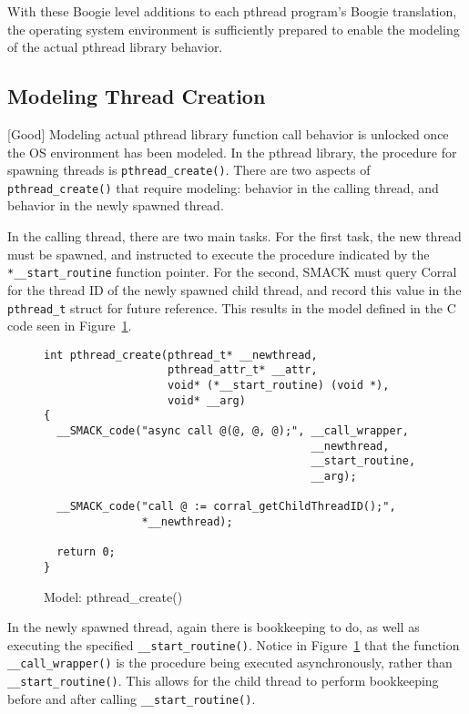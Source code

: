 With these Boogie level additions to each pthread program's Boogie
translation, the operating system environment is sufficiently prepared
to enable the modeling of the actual pthread library behavior.

\subsection{Modeling Thread Creation}
[Good]
Modeling actual pthread library function call behavior is unlocked
once the OS environment has been modeled.  In the pthread library, the
procedure for spawning threads is \lstinline|pthread_create()|.  There
are two aspects of \lstinline|pthread_create()| that require modeling:
behavior in the calling thread, and behavior in the newly spawned
thread.

In the calling thread, there are two main tasks.  For the first task,
the new thread must be spawned, and instructed to execute the
procedure indicated by the \lstinline|*__start_routine| function
pointer.  For the second, SMACK must query Corral for the thread ID of
the newly spawned child thread, and record this value in the
\lstinline|pthread_t| struct for future reference.  This results in
the model defined in the C code seen in Figure~\ref{fig:pthread_create}.

\begin{figure}[h]
\centering
\caption{Model: pthread\_create()}\label{fig:pthread_create}
\begin{lstlisting}
int pthread_create(pthread_t* __newthread,
                   pthread_attr_t* __attr,
                   void* (*__start_routine) (void *),
                   void* __arg)
{
  __SMACK_code("async call @(@, @, @);", __call_wrapper,
                                         __newthread,
                                         __start_routine,
                                         __arg);

  __SMACK_code("call @ := corral_getChildThreadID();",
               *__newthread);

  return 0;
}
\end{lstlisting}
\end{figure}

In the newly spawned thread, again there is bookkeeping to do, as well
as executing the specified \lstinline|__start_routine()|.  Notice in
Figure~\ref{fig:pthread_create} that the function
\lstinline|__call_wrapper()| is the procedure being executed
asynchronously, rather than \lstinline|__start_routine()|.  This
allows for the child thread to perform bookkeeping before and after
calling \lstinline|__start_routine()|.

